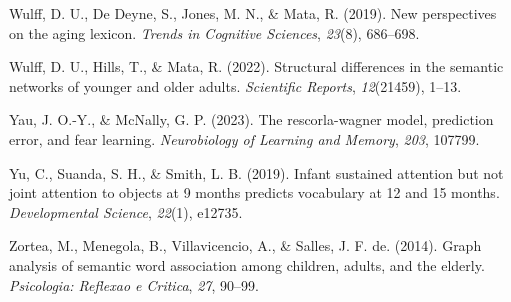 \documentclass[
  man,floatsintext]{apa6}
\newlength{\cslhangindent}
\newlength{\cslentryspacingunit} %
\newenvironment{CSLReferences}[2] %
 {%
  \setlength{\parindent}{0pt}
  \ifodd #1
  \let\oldpar\par
  \def\par{\hangindent=\cslhangindent\oldpar}
  \fi
  \setlength{\parskip}{#2\cslentryspacingunit}
 }%
 {}
\begin{document}
\begin{CSLReferences}{1}{0}
\leavevmode{}%
Wulff, D. U., De Deyne, S., Jones, M. N., \& Mata, R. (2019). New perspectives on the aging lexicon. \emph{Trends in Cognitive Sciences}, \emph{23}(8), 686--698.

\leavevmode{}%
Wulff, D. U., Hills, T., \& Mata, R. (2022). Structural differences in the semantic networks of younger and older adults. \emph{Scientific Reports}, \emph{12}(21459), 1--13.

\leavevmode{}%
Yau, J. O.-Y., \& McNally, G. P. (2023). The rescorla-wagner model, prediction error, and fear learning. \emph{Neurobiology of Learning and Memory}, \emph{203}, 107799.

\leavevmode{}%
Yu, C., Suanda, S. H., \& Smith, L. B. (2019). Infant sustained attention but not joint attention to objects at 9 months predicts vocabulary at 12 and 15 months. \emph{Developmental Science}, \emph{22}(1), e12735.

\leavevmode{}%
Zortea, M., Menegola, B., Villavicencio, A., \& Salles, J. F. de. (2014). Graph analysis of semantic word association among children, adults, and the elderly. \emph{Psicologia: Reflexao e Critica}, \emph{27}, 90--99.

\end{CSLReferences}
\end{document}
